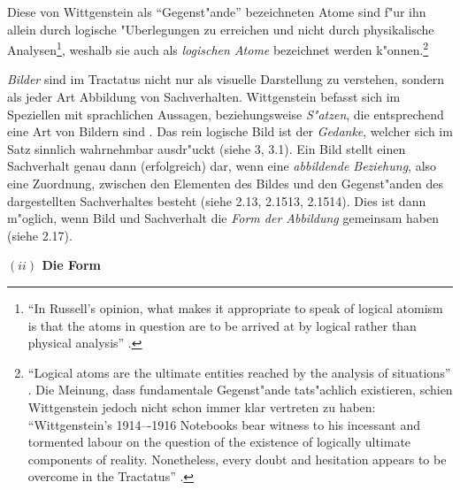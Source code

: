 \documentclass[a4paper, emulatestandardclasses, 12pt]{scrartcl}
\begin{document}
\begin{onehalfspace}
Diese von Wittgenstein als "`Gegenst"ande"' bezeichneten Atome sind f"ur ihn allein durch logische "Uberlegungen zu erreichen und nicht durch physikalische Analysen\footnote{"`In Russell's opinion, what makes it appropriate to speak of logical atomism is that the atoms in question are to be arrived at by logical rather than physical analysis"' \citep{sep-wittgenstein-atomism}.}, weshalb sie auch als \emph{logischen Atome} bezeichnet werden k"onnen.\footnote{"`Logical atoms are the ultimate entities reached by the analysis of situations"' \cite[S. 47]{frascolla2007understanding}. Die Meinung, dass fundamentale Gegenst"ande tats"achlich existieren, schien Wittgenstein jedoch nicht schon immer klar vertreten zu haben: "`Wittgenstein's 1914–-1916 Notebooks bear witness to his incessant and tormented labour on the question of the existence of logically ultimate components of reality. Nonetheless, every doubt and hesitation appears to be overcome in the Tractatus"' \cite[S. 48]{frascolla2007understanding}.} %

\emph{Bilder} sind im Tractatus nicht nur als visuelle Darstellung zu verstehen, sondern als jeder Art Abbildung von Sachverhalten. Wittgenstein befasst sich im Speziellen mit sprachlichen Aussagen, beziehungsweise \emph{S"atzen}, die entsprechend eine Art von Bildern sind \cite[vgl.][S. 66]{mcguinness2002approaches}. Das rein logische Bild ist der \emph{Gedanke}, welcher sich im Satz sinnlich wahrnehmbar ausdr"uckt (siehe 3, 3.1). Ein Bild stellt einen Sachverhalt genau dann (erfolgreich) dar, wenn eine \emph{abbildende Beziehung}, also eine Zuordnung, zwischen den Elementen des Bildes und den Gegenst"anden des dargestellten Sachverhaltes besteht (siehe 2.13, 2.1513, 2.1514). Dies ist dann m"oglich, wenn Bild und Sachverhalt die \emph{Form der Abbildung} gemeinsam haben (siehe 2.17).%


\vspace{5mm}
\noindent\textbf{$(ii)$ Die Form}	


\end{onehalfspace}
\end{document}
